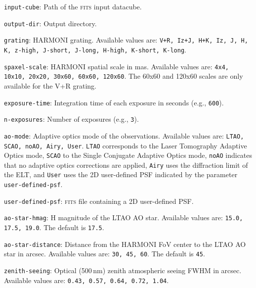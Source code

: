 \documentclass[12pt]{report}
\begin{document}
\begin{description}
\item \texttt{input-cube}: Path of the \textsc{fits} input datacube.

\item \texttt{output-dir}: Output directory.

\item \texttt{grating}: HARMONI grating. Available values are: \texttt{V+R, Iz+J, H+K, Iz, J, H, K, z-high, J-short, J-long, H-high, K-short, K-long}.

\item \texttt{spaxel-scale}: HARMONI spatial scale in mas. Available values are: \texttt{4x4, 10x10, 20x20, 30x60, 60x60, 120x60}. The 60x60 and 120x60 scales are only available for the V+R grating.

\item \texttt{exposure-time}: Integration time of each exposure in seconds (e.g., \texttt{600}).

\item \texttt{n-exposures}: Number of exposures (e.g., \texttt{3}).

\item \texttt{ao-mode}: Adaptive optics mode of the observations. Available values are: \texttt{LTAO, SCAO, noAO, Airy, User}. \texttt{LTAO} corresponds to the Laser Tomography Adaptive Optics mode,  \texttt{SCAO} to the Single Conjugate Adaptive Optics mode, \texttt{noAO} indicates that no adaptive optics corrections are applied, \texttt{Airy} uses the diffraction limit of the ELT, and \texttt{User} uses the 2D user-defined PSF indicated by the parameter \texttt{user-defined-psf}.

\item \texttt{user-defined-psf}: \textsc{fits} file containing a 2D user-defined PSF.

\item \texttt{ao-star-hmag}: H magnitude of the LTAO AO star. Available values are: \texttt{15.0, 17.5, 19.0}. The default is \texttt{17.5}.

\item \texttt{ao-star-distance}: Distance from the HARMONI FoV center to the LTAO AO star in arcsec. Available values are: \texttt{30, 45, 60}. The default is \texttt{45}.

\item \texttt{zenith-seeing}: Optical (500\,nm) zenith atmospheric seeing FWHM in arcsec. Available values are: \texttt{0.43, 0.57, 0.64, 0.72, 1.04}.


\end{description}
\end{document}
